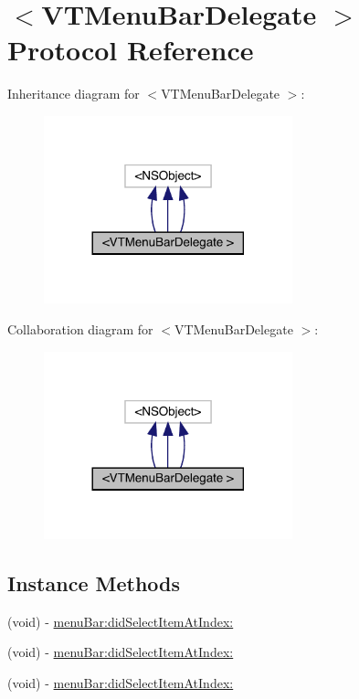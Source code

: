 \hypertarget{protocol_v_t_menu_bar_delegate_01-p}{}\section{$<$V\+T\+Menu\+Bar\+Delegate $>$ Protocol Reference}
\label{protocol_v_t_menu_bar_delegate_01-p}


Inheritance diagram for $<$V\+T\+Menu\+Bar\+Delegate $>$\+:\nopagebreak
\begin{figure}[H]
\begin{center}
\leavevmode
\includegraphics[width=204pt]{protocol_v_t_menu_bar_delegate_01-p__inherit__graph}
\end{center}
\end{figure}


Collaboration diagram for $<$V\+T\+Menu\+Bar\+Delegate $>$\+:\nopagebreak
\begin{figure}[H]
\begin{center}
\leavevmode
\includegraphics[width=204pt]{protocol_v_t_menu_bar_delegate_01-p__coll__graph}
\end{center}
\end{figure}
\subsection*{Instance Methods}
\begin{DoxyCompactItemize}
\item 
(void) -\/ \mbox{\hyperlink{protocol_v_t_menu_bar_delegate_01-p_a3dc0536177243602e74fe509e67563e5}{menu\+Bar\+:did\+Select\+Item\+At\+Index\+:}}
\item 
(void) -\/ \mbox{\hyperlink{protocol_v_t_menu_bar_delegate_01-p_a3dc0536177243602e74fe509e67563e5}{menu\+Bar\+:did\+Select\+Item\+At\+Index\+:}}
\item 
(void) -\/ \mbox{\hyperlink{protocol_v_t_menu_bar_delegate_01-p_a3dc0536177243602e74fe509e67563e5}{menu\+Bar\+:did\+Select\+Item\+At\+Index\+:}}
\end{DoxyCompactItemize}


